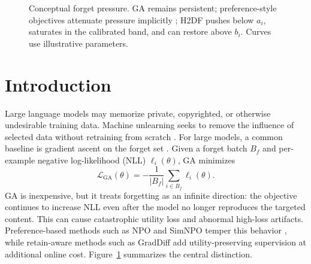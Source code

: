 \documentclass[10pt,twocolumn]{article}
\newcommand{\Lcal}{\mathcal{L}}
\newcommand{\method}{\textsc{H2DF}}
\begin{document}
\begin{figure}[t]
\centering
{}
\caption{Conceptual forget pressure. GA remains persistent; preference-style
objectives attenuate pressure implicitly
\citep{zhang2024negative,fan2024simplicity}; \method{} pushes below $a_i$,
saturates in the calibrated band, and can restore above $b_i$. Curves use
illustrative parameters.}
\label{fig:first-page-contrast}
\end{figure}

\section{Introduction}

Large language models may memorize private, copyrighted, or otherwise undesirable
training data. Machine unlearning seeks to remove the influence of selected data
without retraining from scratch \citep{cao2015towards}. For large models, a
common baseline is gradient ascent on the forget set \citep{yao2023large}. Given
a forget batch $B_f$ and per-example negative log-likelihood (NLL)
$\ell_i(\theta)$, GA minimizes
\begin{equation}
  \Lcal_{\mathrm{GA}}(\theta)
  =-\frac{1}{|B_f|}\sum_{i\in B_f}\ell_i(\theta).
  \label{eq:ga}
\end{equation}
GA is inexpensive, but it treats forgetting as an infinite direction: the
objective continues to increase NLL even after the model no longer reproduces the
targeted content. This can cause catastrophic utility loss and abnormal high-loss
artifacts. Preference-based methods such as NPO and SimNPO temper this behavior
\citep{zhang2024negative,fan2024simplicity}, while retain-aware methods such as
GradDiff add utility-preserving supervision at additional online cost.
Figure~\ref{fig:first-page-contrast} summarizes the central distinction.
\end{document}

